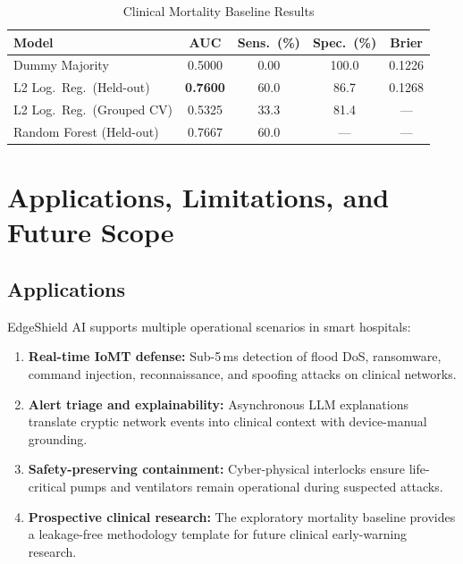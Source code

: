 \documentclass[conference]{IEEEtran}
\begin{document}
\begin{table}[t]
\centering
\caption{Clinical Mortality Baseline Results}
\footnotesize
\setlength{\tabcolsep}{4pt}
\begin{tabular}{lcccc}
\toprule
\textbf{Model} & \textbf{AUC} & \textbf{Sens.\ (\%)} & \textbf{Spec.\ (\%)} & \textbf{Brier} \\
\midrule
Dummy Majority & 0.5000 & 0.00 & 100.0 & 0.1226 \\
L2 Log.\ Reg.\ (Held-out) & \textbf{0.7600} & 60.0 & 86.7 & 0.1268 \\
L2 Log.\ Reg.\ (Grouped CV) & 0.5325 & 33.3 & 81.4 & --- \\
Random Forest (Held-out) & 0.7667 & 60.0 & --- & --- \\
\bottomrule
\end{tabular}
\label{tab:clinical}
\end{table}

\section{Applications, Limitations, and Future Scope}

\subsection{Applications}
EdgeShield AI supports multiple operational scenarios in smart hospitals:
\begin{enumerate}
    \item \textbf{Real-time IoMT defense:} Sub-5\,ms detection of flood DoS, ransomware, command injection, reconnaissance, and spoofing attacks on clinical networks.
    \item \textbf{Alert triage and explainability:} Asynchronous LLM explanations translate cryptic network events into clinical context with device-manual grounding.
    \item \textbf{Safety-preserving containment:} Cyber-physical interlocks ensure life-critical pumps and ventilators remain operational during suspected attacks.
    \item \textbf{Prospective clinical research:} The exploratory mortality baseline provides a leakage-free methodology template for future clinical early-warning research.
\end{enumerate}
\end{document}
